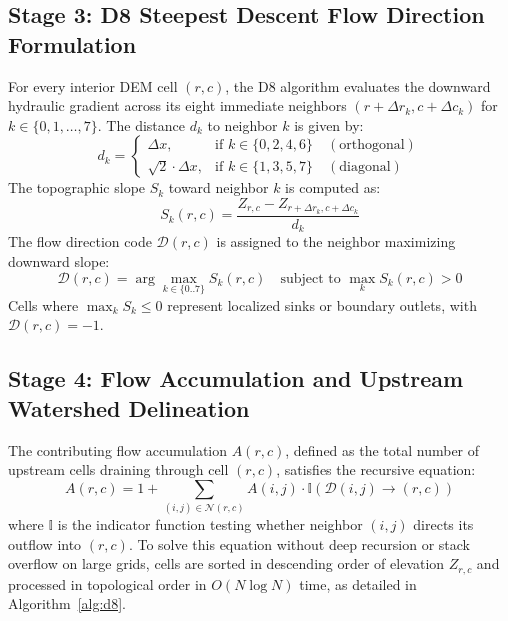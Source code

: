\documentclass[11pt,a4paper]{article}
\begin{document}
\subsection{Stage 3: D8 Steepest Descent Flow Direction Formulation}
For every interior DEM cell $(r, c)$, the D8 algorithm evaluates the downward hydraulic gradient across its eight immediate neighbors $(r + \Delta r_k, c + \Delta c_k)$ for $k \in \{0, 1, \dots, 7\}$. The distance $d_k$ to neighbor $k$ is given by:
\begin{equation}
d_k = \begin{cases}
\Delta x, & \text{if } k \in \{0, 2, 4, 6\} \quad (\text{orthogonal}) \\
\sqrt{2} \cdot \Delta x, & \text{if } k \in \{1, 3, 5, 7\} \quad (\text{diagonal})
\end{cases}
\label{eq:neighbor_dist}
\end{equation}
The topographic slope $S_k$ toward neighbor $k$ is computed as:
\begin{equation}
S_k(r, c) = \frac{Z_{r, c} - Z_{r + \Delta r_k, c + \Delta c_k}}{d_k}
\label{eq:d8_slope}
\end{equation}
The flow direction code $\mathcal{D}(r, c)$ is assigned to the neighbor maximizing downward slope:
\begin{equation}
\mathcal{D}(r, c) = \arg\max_{k \in \{0..7\}} S_k(r, c) \quad \text{subject to } \max_k S_k(r, c) > 0
\label{eq:flow_dir}
\end{equation}
Cells where $\max_k S_k \le 0$ represent localized sinks or boundary outlets, with $\mathcal{D}(r, c) = -1$.

\subsection{Stage 4: Flow Accumulation and Upstream Watershed Delineation}
The contributing flow accumulation $A(r, c)$, defined as the total number of upstream cells draining through cell $(r, c)$, satisfies the recursive equation:
\begin{equation}
A(r, c) = 1 + \sum_{(i, j) \in \mathcal{N}(r, c)} A(i, j) \cdot \mathbb{I}\left(\mathcal{D}(i, j) \rightarrow (r, c)\right)
\label{eq:flow_acc}
\end{equation}
where $\mathbb{I}$ is the indicator function testing whether neighbor $(i, j)$ directs its outflow into $(r, c)$. To solve this equation without deep recursion or stack overflow on large grids, cells are sorted in descending order of elevation $Z_{r, c}$ and processed in topological order in $O(N \log N)$ time, as detailed in Algorithm~\ref{alg:d8}.
\end{document}
